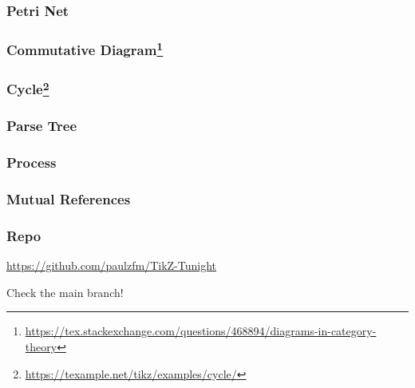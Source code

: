 \documentclass[usenames,xcolor=svgnames,11pt,sans,handout]{beamer}
\newcommand{\key}[1]{{\color{theme} #1}}
\begin{document}
\begin{frame}
    \frametitle{Petri Net}

    \centering
\end{frame}

\begin{frame}
    \frametitle{Commutative Diagram\footnote{\url{https://tex.stackexchange.com/questions/468894/diagrams-in-category-theory}}}

    \centering
\end{frame}

\begin{frame}
    \frametitle{Cycle\footnote{\url{https://texample.net/tikz/examples/cycle/}}}

    \centering
\end{frame}

\begin{frame}
    \frametitle{Parse Tree}

    \begin{center}
        \footnotesize
    \end{center}
\end{frame}

\begin{frame}
    \frametitle{Process}

    \centering
\end{frame}

\begin{frame}[fragile]
    \frametitle{Mutual References}

    

    \begin{center}
    \end{center}
\end{frame}

\begin{frame}
    \frametitle{Repo}

    \centering\Large
    
    \url{https://github.com/paulzfm/TikZ-Tunight}

    Check the \key{main} branch!
\end{frame}
\end{document}
